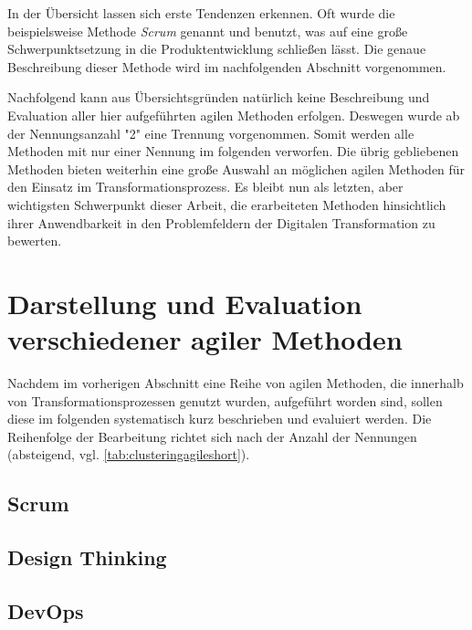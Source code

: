 In der Übersicht lassen sich erste Tendenzen erkennen. Oft wurde die beispielsweise Methode \textit{Scrum} genannt und benutzt, was auf eine große Schwerpunktsetzung in die Produktentwicklung schließen lässt. Die genaue Beschreibung dieser Methode wird im nachfolgenden Abschnitt vorgenommen. 

Nachfolgend kann aus Übersichtsgründen natürlich keine Beschreibung und Evaluation aller hier aufgeführten agilen Methoden erfolgen. Deswegen wurde ab der  Nennungsanzahl "2" eine Trennung vorgenommen. Somit werden alle Methoden mit nur einer Nennung im folgenden verworfen. Die übrig gebliebenen Methoden bieten weiterhin eine große Auswahl an möglichen agilen Methoden für den Einsatz im Transformationsprozess. Es bleibt nun als letzten, aber wichtigsten Schwerpunkt dieser Arbeit, die erarbeiteten Methoden hinsichtlich ihrer Anwendbarkeit in den Problemfeldern der Digitalen Transformation zu bewerten.

\section{Darstellung und Evaluation verschiedener agiler Methoden}


Nachdem im vorherigen Abschnitt eine Reihe von agilen Methoden, die innerhalb von Transformationsprozessen genutzt wurden, aufgeführt worden sind, sollen diese im folgenden systematisch kurz beschrieben und evaluiert werden. Die Reihenfolge der Bearbeitung richtet sich nach der Anzahl der Nennungen (absteigend, vgl. \ref{tab:clusteringagileshort}).

\subsection{Scrum}

\todots

\subsection{Design Thinking}

\todots

\subsection{DevOps}

